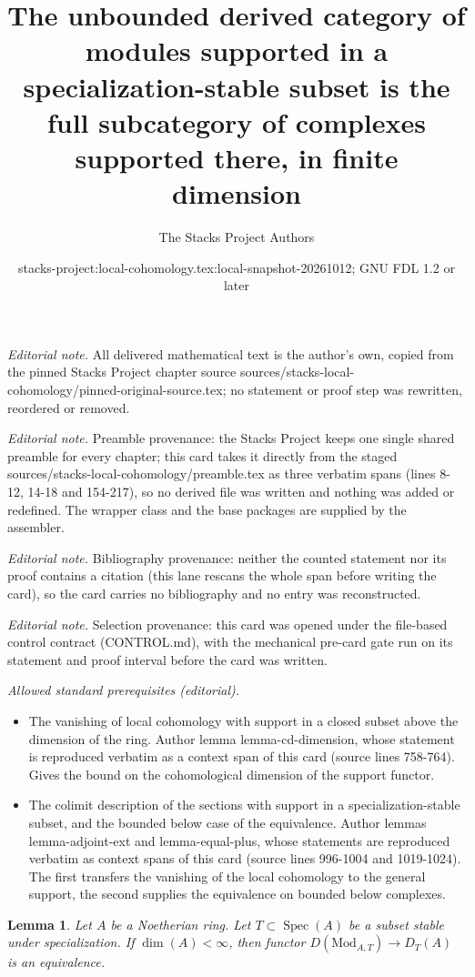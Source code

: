 \documentclass[10pt,a4paper]{amsart}
\title{The unbounded derived category of modules supported in a specialization-stable subset is the full subcategory of complexes supported there, in finite dimension}
\author{The Stacks Project Authors}
\date{stacks-project:local-cohomology.tex:local-snapshot-20261012; GNU FDL 1.2 or later}
\theoremstyle{plain}
\newtheorem{lemma}[subsection]{Lemma}
\theoremstyle{definition}
\theoremstyle{remark}
\numberwithin{equation}{subsection}
\def\Spec{\mathop{\mathrm{Spec}}}
\begin{document}
\maketitle
\noindent\textit{Editorial note.} All delivered mathematical text is the author's own, copied from the pinned Stacks Project chapter source sources/stacks-local-cohomology/pinned-original-source.tex; no statement or proof step was rewritten, reordered or removed.\par\medskip
\noindent\textit{Editorial note.} Preamble provenance: the Stacks Project keeps one single shared preamble for every chapter; this card takes it directly from the staged sources/stacks-local-cohomology/preamble.tex as three verbatim spans (lines 8-12, 14-18 and 154-217), so no derived file was written and nothing was added or redefined. The wrapper class and the base packages are supplied by the assembler.\par\medskip
\noindent\textit{Editorial note.} Bibliography provenance: neither the counted statement nor its proof contains a citation (this lane rescans the whole span before writing the card), so the card carries no bibliography and no entry was reconstructed.\par\medskip
\noindent\textit{Editorial note.} Selection provenance: this card was opened under the file-based control contract (CONTROL.md), with the mechanical pre-card gate run on its statement and proof interval before the card was written.\par\medskip
\noindent\textit{Allowed standard prerequisites (editorial).}\begin{itemize}
\item The vanishing of local cohomology with support in a closed subset above the dimension of the ring. Author lemma lemma-cd-dimension, whose statement is reproduced verbatim as a context span of this card (source lines 758-764). Gives the bound on the cohomological dimension of the support functor.
\item The colimit description of the sections with support in a specialization-stable subset, and the bounded below case of the equivalence. Author lemmas lemma-adjoint-ext and lemma-equal-plus, whose statements are reproduced verbatim as context spans of this card (source lines 996-1004 and 1019-1024). The first transfers the vanishing of the local cohomology to the general support, the second supplies the equivalence on bounded below complexes.
\end{itemize}\medskip
\begin{lemma}
\label{lemma-equal-full}
Let $A$ be a Noetherian ring. Let $T \subset \Spec(A)$ be a subset stable
under specialization. If $\dim(A) < \infty$, then functor
$D(\text{Mod}_{A, T}) \to D_T(A)$ is an equivalence.
\end{lemma}
\end{document}
